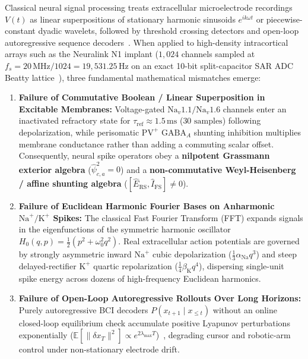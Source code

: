 \documentclass[11pt,letterpaper]{article}
\theoremstyle{definition}
\begin{document}
Classical neural signal processing treats extracellular microelectrode recordings $V(t)$ as linear superpositions of stationary harmonic sinusoids $e^{ik\omega t}$ or piecewise-constant dyadic wavelets, followed by threshold crossing detectors and open-loop autoregressive sequence decoders~\cite{shannon1938,hodgkin1952}. When applied to high-density intracortical arrays such as the Neuralink N1 implant ($1{,}024$ channels sampled at $f_s = 20\,\text{MHz}/1024 = 19{,}531.25\,\text{Hz}$ on an exact 10-bit split-capacitor SAR ADC Beatty lattice~\cite{solidsf_n1_monograph}), three fundamental mathematical mismatches emerge:
\begin{enumerate}
  \item \textbf{Failure of Commutative Boolean / Linear Superposition in Excitable Membranes:} Voltage-gated $\mathrm{Na}_v1.1/\mathrm{Na}_v1.6$ channels enter an inactivated refractory state for $\tau_{\mathrm{ref}}\approx 1.5\,\text{ms}$ ($30\text{ samples}$) following depolarization, while perisomatic $\mathrm{PV}^+$ $\mathrm{GABA}_A$ shunting inhibition multiplies membrane conductance rather than adding a commuting scalar offset. Consequently, neural spike operators obey a \textbf{nilpotent Grassmann exterior algebra} ($\hat{\psi}_{c,a}^2 = 0$) and a \textbf{non-commutative Weyl-Heisenberg / affine shunting algebra} ($[\hat{E}_{\mathrm{RS}},\hat{I}_{\mathrm{FS}}]\neq 0$).
  \item \textbf{Failure of Euclidean Harmonic Fourier Bases on Anharmonic $\mathrm{Na}^+/\mathrm{K}^+$ Spikes:} The classical Fast Fourier Transform (FFT) expands signals in the eigenfunctions of the symmetric harmonic oscillator $H_0(q,p)=\frac{1}{2}(p^2+\omega_0^2 q^2)$. Real extracellular action potentials are governed by strongly asymmetric inward $\mathrm{Na}^+$ cubic depolarization ($\frac{1}{3}\alpha_{\mathrm{Na}}q^3$) and steep delayed-rectifier $\mathrm{K}^+$ quartic repolarization ($\frac{1}{4}\beta_{\mathrm{K}}q^4$), dispersing single-unit spike energy across dozens of high-frequency Euclidean harmonics.
  \item \textbf{Failure of Open-Loop Autoregressive Rollouts Over Long Horizons:} Purely autoregressive BCI decoders $P(x_{t+1}\mid x_{\le t})$ without an online closed-loop equilibrium check accumulate positive Lyapunov perturbations exponentially ($\mathbb{E}[\|\delta x_T\|^2]\propto e^{2\lambda_{\max}T}$)~\cite{solidsf_doomed2026,solidsf_lecun2026}, degrading cursor and robotic-arm control under non-stationary electrode drift.
\end{enumerate}
\end{document}
